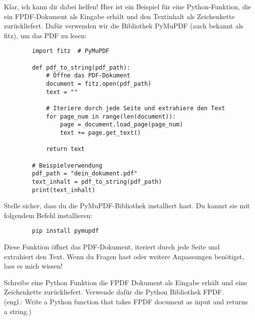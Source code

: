 \begin{tcolorbox}[
	enhanced,
	colback=BhtGrey!5!white,
	colframe=BhtGrey!75!black!50,
	title= Copilot
	]
	Klar, ich kann dir dabei helfen! Hier ist ein Beispiel für eine Python-Funktion, die ein FPDF-Dokument als Eingabe erhält und den Textinhalt als Zeichenkette zurückliefert. Dafür verwenden wir die Bibliothek PyMuPDF (auch bekannt als fitz), um das PDF zu lesen:\\
	\begin{verbatim}
		import fitz  # PyMuPDF
		
		def pdf_to_string(pdf_path):
		    # Öffne das PDF-Dokument
		    document = fitz.open(pdf_path)
		    text = ""
		
		    # Iteriere durch jede Seite und extrahiere den Text
		    for page_num in range(len(document)):
		        page = document.load_page(page_num)
		        text += page.get_text()

		    return text
		
		# Beispielverwendung
		pdf_path = "dein_dokument.pdf"
		text_inhalt = pdf_to_string(pdf_path)
		print(text_inhalt)
	\end{verbatim}
	Stelle sicher, dass du die PyMuPDF-Bibliothek installiert hast. Du kannst sie mit folgendem Befehl installieren:
	\begin{verbatim}
		pip install pymupdf
	\end{verbatim}
	Diese Funktion öffnet das PDF-Dokument, iteriert durch jede Seite und extrahiert den Text. Wenn du Fragen hast oder weitere Anpassungen benötigst, lass es mich wissen!
\end{tcolorbox}

\newpage

\begin{tcolorbox}[
	enhanced,
	breakable,
	colback=BhtColorYellow!5!white,
	colframe=BhtColorYellow!75!black,
	title= Python Funktion
	]
	Schreibe eine Python Funktion die FPDF Dokument als Eingabe erhält und eine Zeichenkette zurückliefert. Verwende dafür die Python Bibliothek FPDF.\\
	(engl.: Write a Python function that takes FPDF document as input and returns a string.)
\end{tcolorbox}

